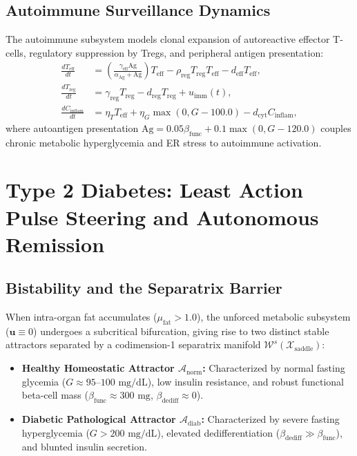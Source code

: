\documentclass[11pt,a4paper]{article}
\begin{document}
\subsection{Autoimmune Surveillance Dynamics}

The autoimmune subsystem models clonal expansion of autoreactive effector T-cells, regulatory suppression by Tregs, and peripheral antigen presentation:
\begin{align}
\frac{dT_{\mathrm{eff}}}{dt} &= \left( \frac{\gamma_{\mathrm{eff}} \mathrm{Ag}}{\alpha_{\mathrm{Ag}} + \mathrm{Ag}} \right) T_{\mathrm{eff}} - \rho_{\mathrm{reg}} T_{\mathrm{reg}} T_{\mathrm{eff}} - d_{\mathrm{eff}} T_{\mathrm{eff}}, \label{eq:dT_eff} \\
\frac{dT_{\mathrm{reg}}}{dt} &= \gamma_{\mathrm{reg}} T_{\mathrm{reg}} - d_{\mathrm{reg}} T_{\mathrm{reg}} + u_{\mathrm{imm}}(t), \label{eq:dT_reg} \\
\frac{dC_{\mathrm{inflam}}}{dt} &= \eta_T T_{\mathrm{eff}} + \eta_G \max\left(0, G - 100.0\right) - d_{\mathrm{cyt}} C_{\mathrm{inflam}}, \label{eq:dC}
\end{align}
where autoantigen presentation $\mathrm{Ag} = 0.05 \beta_{\mathrm{func}} + 0.1 \max\left(0, G - 120.0\right)$ couples chronic metabolic hyperglycemia and ER stress to autoimmune activation.

\section{Type 2 Diabetes: Least Action Pulse Steering and Autonomous Remission}

\subsection{Bistability and the Separatrix Barrier}

When intra-organ fat accumulates ($\mu_{\mathrm{fat}} > 1.0$), the unforced metabolic subsystem ($\bm{u} \equiv 0$) undergoes a subcritical bifurcation, giving rise to two distinct stable attractors separated by a codimension-1 separatrix manifold $\mathcal{W}^s(\mathcal{X}_{\mathrm{saddle}})$:
\begin{itemize}
    \item \textbf{Healthy Homeostatic Attractor $\mathcal{A}_{\mathrm{norm}}$:} Characterized by normal fasting glycemia ($G \approx 95\text{--}100\text{ mg/dL}$), low insulin resistance, and robust functional beta-cell mass ($\beta_{\mathrm{func}} \approx 300\text{ mg}$, $\beta_{\mathrm{dediff}} \approx 0$).
    \item \textbf{Diabetic Pathological Attractor $\mathcal{A}_{\mathrm{diab}}$:} Characterized by severe fasting hyperglycemia ($G > 200\text{ mg/dL}$), elevated dedifferentiation ($\beta_{\mathrm{dediff}} \gg \beta_{\mathrm{func}}$), and blunted insulin secretion.
\end{itemize}
\end{document}
